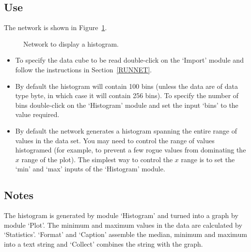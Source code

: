 \subsection{Use}

The network is shown in Figure~\ref{HISTNETF}.

\begin{figure}[htbp]

\begin{center}
\leavevmode
\epsfxsize=371pt
\end{center}

\caption[Network to display a histogram.]{Network to display a histogram.
\label{HISTNETF} }

\end{figure}

\begin{itemize}

  \item To specify the data cube to be read double-click on the `Import'
   module and follow the instructions in Section~\ref{RUNNET}.

  \item By default the histogram will contain 100 bins (unless the data
   are of data type byte, in which case it will contain 256 bins). To
   specify the number of bins double-click on the `Histogram' module
   and set the input `bins' to the value required.

  \item By default the network generates a histogram spanning the
   entire range of values in the data set. You may need to control
   the range of values histogramed (for example, to prevent a few
   rogue values from dominating the $x$ range of the plot). The
   simplest way to control the $x$ range is to set the `min' and `max'
   inputs of the `Histogram' module.

\end{itemize}

\subsection{Notes}

The histogram is generated by module `Histogram' and turned into a graph
by module `Plot'. The minimum and maximum values in the data are
calculated by `Statistics'. `Format' and `Caption' assemble the median,
minimum and maximum into a text string and `Collect' combines the string
with the graph.

